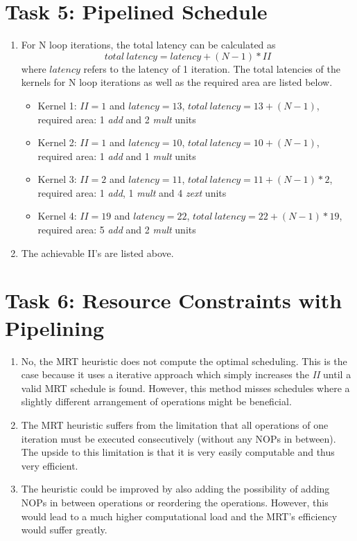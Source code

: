 \documentclass{article}
\begin{document}
    \section{Task 5: Pipelined Schedule}
    \begin{enumerate}
        \item For N loop iterations, the total latency can be calculated as \[total\ latency = latency + (N-1)*II\] where $latency$ refers to the latency of 1 iteration. The total latencies of the kernels for N loop iterations as well as the required area are listed below.
        \begin{itemize}
            \item Kernel 1: $II = 1$ and $latency = 13$, $total\ latency = 13 + (N-1)$, required area: 1 \emph{add} and 2 \emph{mult} units
            \item Kernel 2: $II = 1$ and $latency = 10$, $total\ latency = 10 + (N-1)$,
            required area: 1 \emph{add} and 1 \emph{mult} units
            \item Kernel 3: $II = 2$ and $latency = 11$, $total\ latency = 11 + (N-1)*2$,
            required area: 1 \emph{add}, 1 \emph{mult} and 4 \emph{zext} units
            \item Kernel 4: $II = 19$ and $latency = 22$, $total\ latency = 22 + (N-1)*19$, required area: 5 \emph{add} and 2 \emph{mult} units
        \end{itemize}
        \item The achievable II's are listed above.
    \end{enumerate}
    \section{Task 6: Resource Constraints with Pipelining}
    \begin{enumerate}
        \item No, the MRT heuristic does not compute the optimal scheduling. This is the case because it uses a iterative approach which simply increases the \emph{II} until a valid MRT schedule is found. However, this method misses schedules where a slightly different arrangement of operations might be beneficial.
        \item The MRT heuristic suffers from the limitation that all operations of one iteration must be executed consecutively (without any NOPs in between). The upside to this limitation is that it is very easily computable and thus very efficient.
        \item The heuristic could be improved by also adding the possibility of adding NOPs in between operations or reordering the operations. However, this would lead to a much higher computational load and the MRT's efficiency would suffer greatly.
    \end{enumerate}
    
\end{document}
